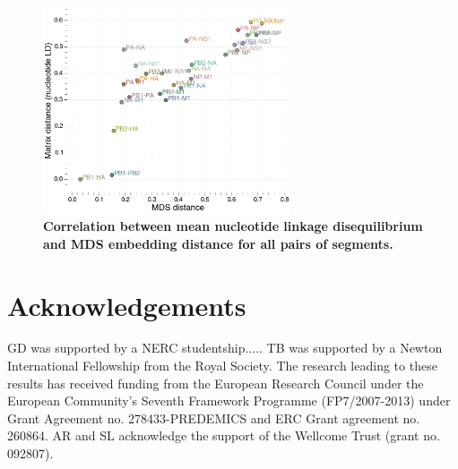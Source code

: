 \documentclass[11pt,oneside,letterpaper]{article}
\begin{document}
\begin{figure}
\centering  
\includegraphics[width=0.65\textwidth]  {supp_figures/InfB_ntLD_MatrixMDScorr.png}
\caption{\textbf{Correlation between mean nucleotide linkage disequilibrium and MDS embedding distance for all pairs of segments.}}
\label{}
\end{figure}


\section*{Acknowledgements}
GD was supported by a NERC studentship..... 
TB was supported by a Newton International Fellowship from the Royal Society. 
The research leading to these results has received funding from the European Research Council under the European Community's Seventh Framework Programme (FP7/2007-2013) under Grant Agreement no. 278433-PREDEMICS and ERC Grant agreement no. 260864.
AR and SL acknowledge the support of the Wellcome Trust (grant no. 092807).



\end{document}
